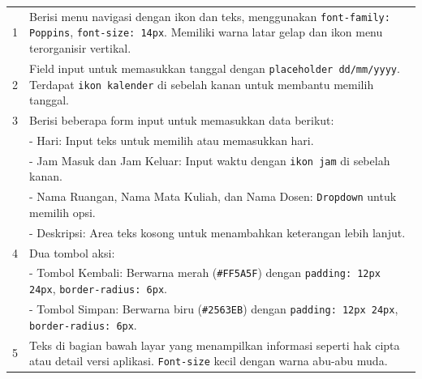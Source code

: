 \begin{enumerate}
{\begin{longtable}{p{4cm} p{9cm}}
		      1                                & Berisi menu navigasi dengan ikon dan teks, menggunakan \texttt{font-family: Poppins}, \texttt{font-size: 14px}. Memiliki warna latar gelap dan ikon menu terorganisir vertikal. \\
		      2                                & Field input untuk memasukkan tanggal dengan \texttt{placeholder dd/mm/yyyy}. Terdapat \texttt{ikon kalender} di sebelah kanan untuk membantu memilih tanggal.                   \\
		      3                                & Berisi beberapa form input untuk memasukkan data berikut:                                                                                                                       \\
		                                       & - Hari: Input teks untuk memilih atau memasukkan hari.                                                                                                                          \\
		                                       & - Jam Masuk dan Jam Keluar: Input waktu dengan \texttt{ikon jam} di sebelah kanan.                                                                                              \\
		                                       & - Nama Ruangan, Nama Mata Kuliah, dan Nama Dosen: \texttt{Dropdown} untuk memilih opsi.                                                                                         \\
		                                       & - Deskripsi: Area teks kosong untuk menambahkan keterangan lebih lanjut.                                                                                                        \\
		      4                                & Dua tombol aksi:                                                                                                                                                                \\
		                                       & - Tombol Kembali: Berwarna merah (\texttt{\#FF5A5F}) dengan \texttt{padding: 12px 24px}, \texttt{border-radius: 6px}.                                                           \\
		                                       & - Tombol Simpan: Berwarna biru (\texttt{\#2563EB}) dengan \texttt{padding: 12px 24px}, \texttt{border-radius: 6px}.                                                             \\
		      5                                & Teks di bagian bawah layar yang menampilkan informasi seperti hak cipta atau detail versi aplikasi. \texttt{Font-size} kecil dengan warna abu-abu muda.                         \\
		      \hline
	      \end{longtable}
	      }


\end{enumerate}
